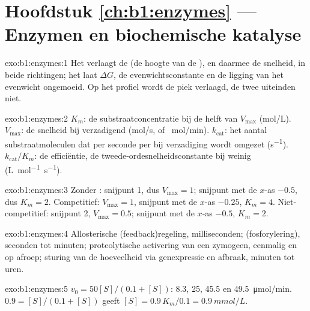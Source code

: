 \section*{Hoofdstuk \ref{ch:b1:enzymes} --- Enzymen en biochemische katalyse}

\begin{solution}{exo:b1:enzymes:1}
Het verlaagt de  (de hoogte van de ), en
daarmee de snelheid, in beide richtingen; het laat $\Delta G$, de
evenwichtsconstante en de ligging van het evenwicht ongemoeid. Op het profiel
wordt de piek verlaagd, de twee uiteinden niet.
\end{solution}

\begin{solution}{exo:b1:enzymes:2}
$K_m$: de substraatconcentratie bij de helft van $V_{\max}$ (\unit{mol/L}).
$V_{\max}$: de snelheid bij verzadigend  (\unit{mol/s}, of \unit{\micro
mol/min}). $k_{\text{cat}}$: het aantal substraatmoleculen dat per seconde per
 bij verzadiging wordt omgezet (\unit{s^{-1}}). $k_{\text{cat}}/K_m$: de
efficiëntie, de tweede-ordesnelheidsconstante bij weinig 
(\unit{L.mol^{-1}.s^{-1}}).
\end{solution}

\begin{solution}{exo:b1:enzymes:3}
Zonder : snijpunt 1, dus $V_{\max} = 1$; snijpunt met de $x$-as $-0.5$, dus
$K_m = 2$. Competitief: $V_{\max} = 1$, snijpunt met de $x$-as $-0.25$, $K_m = 4$.
Niet-competitief: snijpunt 2, $V_{\max} = 0.5$; snijpunt met de $x$-as $-0.5$,
$K_m = 2$.
\end{solution}

\begin{solution}{exo:b1:enzymes:4}
Allosterische (feedback)regeling, milliseconden; 
(fosforylering), seconden tot minuten; proteolytische activering van een zymogeen,
eenmalig en op afroep; sturing van de hoeveelheid via genexpressie en afbraak,
minuten tot uren.
\end{solution}

\begin{solution}{exo:b1:enzymes:5}
$v_0 = 50[S]/(0.1 + [S])$: 8.3, 25, 45.5 en \qty{49.5}{\micro mol/min}.
$0.9 = [S]/(0.1 + [S])$ geeft $[S] = 0.9\,K_m/0.1 = \qty{0.9}{mmol/L}$.
\end{solution}

